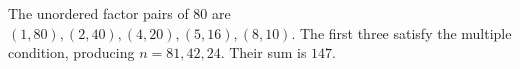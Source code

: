 The unordered factor pairs of 80 are $(1,80),(2,40),(4,20),(5,16),(8,10)$. The first three satisfy the multiple condition, producing $n=81,42,24$. Their sum is $\boxed{147}$.
